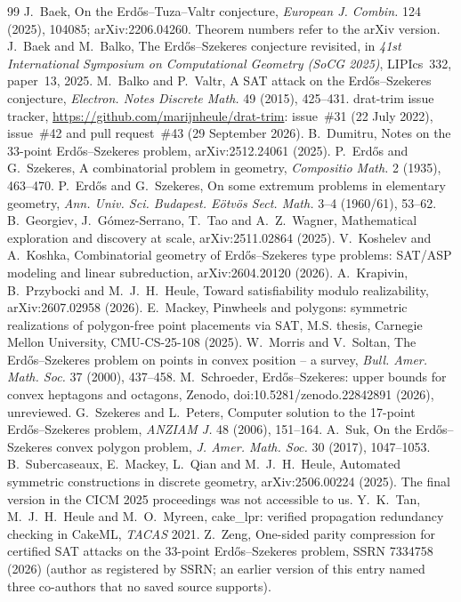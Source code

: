 \documentclass[11pt]{article}
\theoremstyle{remark}
\begin{document}
\begin{thebibliography}{99}
 J.~Baek, On the Erd\H{o}s--Tuza--Valtr conjecture, \emph{European J. Combin.} 124 (2025), 104085; arXiv:2206.04260. Theorem numbers refer to the arXiv version.
 J.~Baek and M.~Balko, The Erd\H{o}s--Szekeres conjecture revisited, in \emph{41st International Symposium on Computational Geometry (SoCG 2025)}, LIPIcs~332, paper~13, 2025.
 M.~Balko and P.~Valtr, A SAT attack on the Erd\H{o}s--Szekeres conjecture, \emph{Electron. Notes Discrete Math.} 49 (2015), 425--431.
 drat-trim issue tracker, \url{https://github.com/marijnheule/drat-trim}: issue~\#31 (22 July 2022), issue~\#42 and pull request~\#43 (29 September 2026).
 B.~Dumitru, Notes on the 33-point Erd\H{o}s--Szekeres problem, arXiv:2512.24061 (2025).
 P.~Erd\H{o}s and G.~Szekeres, A combinatorial problem in geometry, \emph{Compositio Math.} 2 (1935), 463--470.
 P.~Erd\H{o}s and G.~Szekeres, On some extremum problems in elementary geometry, \emph{Ann. Univ. Sci. Budapest. E\"otv\"os Sect. Math.} 3--4 (1960/61), 53--62.
 B.~Georgiev, J.~G\'omez-Serrano, T.~Tao and A.~Z.~Wagner, Mathematical exploration and discovery at scale, arXiv:2511.02864 (2025).
 V.~Koshelev and A.~Koshka, Combinatorial geometry of Erd\H{o}s--Szekeres type problems: SAT/ASP modeling and linear subreduction, arXiv:2604.20120 (2026).
 A.~Krapivin, B.~Przybocki and M.~J.~H.~Heule, Toward satisfiability modulo realizability, arXiv:2607.02958 (2026).
 E.~Mackey, Pinwheels and polygons: symmetric realizations of polygon-free point placements via SAT, M.S. thesis, Carnegie Mellon University, CMU-CS-25-108 (2025).
 W.~Morris and V.~Soltan, The Erd\H{o}s--Szekeres problem on points in convex position -- a survey, \emph{Bull. Amer. Math. Soc.} 37 (2000), 437--458.
 M.~Schroeder, Erd\H{o}s--Szekeres: upper bounds for convex heptagons and octagons, Zenodo, doi:10.5281/zenodo.22842891 (2026), unreviewed.
 G.~Szekeres and L.~Peters, Computer solution to the 17-point Erd\H{o}s--Szekeres problem, \emph{ANZIAM J.} 48 (2006), 151--164.
 A.~Suk, On the Erd\H{o}s--Szekeres convex polygon problem, \emph{J. Amer. Math. Soc.} 30 (2017), 1047--1053.
 B.~Subercaseaux, E.~Mackey, L.~Qian and M.~J.~H.~Heule, Automated symmetric constructions in discrete geometry, arXiv:2506.00224 (2025). The final version in the CICM 2025 proceedings was not accessible to us.
 Y.~K.~Tan, M.~J.~H.~Heule and M.~O.~Myreen, cake\_lpr: verified propagation redundancy checking in CakeML, \emph{TACAS} 2021.
 Z.~Zeng, One-sided parity compression for certified SAT attacks on the 33-point Erd\H{o}s--Szekeres problem, SSRN 7334758 (2026) (author as registered by SSRN; an earlier version of this entry named three co-authors that no saved source supports).
\end{thebibliography}
\end{document}
